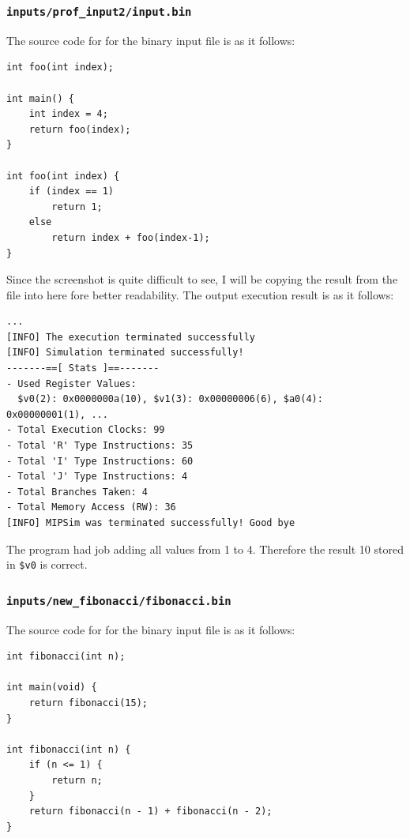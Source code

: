 \documentclass{homework}
\begin{document}
\subsubsection{\texttt{inputs/prof_input2/input.bin}}
The source code for for the binary input file is as it follows:
\\
\begin{center}
\begin{code}
\begin{verbatim}
int foo(int index);

int main() {
    int index = 4;
    return foo(index);
}

int foo(int index) {
    if (index == 1)
        return 1;
    else
        return index + foo(index-1);
}
\end{verbatim}
\end{code}
\end{center}

Since the screenshot is quite difficult to see, I will be copying the result from the file into here fore better readability. The output execution result is as it follows: 
\\
\begin{center}
\begin{code}
\begin{verbatim}
...
[INFO] The execution terminated successfully
[INFO] Simulation terminated successfully!
-------==[ Stats ]==-------
- Used Register Values:
  $v0(2): 0x0000000a(10), $v1(3): 0x00000006(6), $a0(4): 0x00000001(1), ...
- Total Execution Clocks: 99
- Total 'R' Type Instructions: 35
- Total 'I' Type Instructions: 60
- Total 'J' Type Instructions: 4
- Total Branches Taken: 4
- Total Memory Access (RW): 36
[INFO] MIPSim was terminated successfully! Good bye
\end{verbatim}
\end{code}
\end{center}
The program had job adding all values from 1 to 4. Therefore the result 10 stored in \texttt{\$v0} is correct.
\pagebreak

\subsubsection{\texttt{inputs/new_fibonacci/fibonacci.bin}}
The source code for for the binary input file is as it follows:
\\
\begin{center}
\begin{code}
\begin{verbatim}
int fibonacci(int n);

int main(void) {
    return fibonacci(15);
}

int fibonacci(int n) {
    if (n <= 1) {
        return n;
    }
    return fibonacci(n - 1) + fibonacci(n - 2);
}
\end{verbatim}
\end{code}
\end{center}
\end{document}

